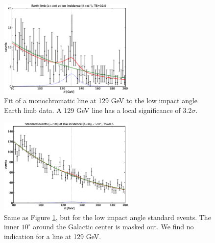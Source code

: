 \documentclass[aps,twocolumn,prd,superscriptaddress,showpacs,nofootinbib,fixfloat]{revtex4}
\begin{document}
\begin{figure}[p]
\centering
\includegraphics[width=0.6\textwidth]{plots/albedo_line_thetaCut.eps}
\caption{Fit of a monochromatic line at 129 GeV to the low impact angle Earth
  limb data. A 129 GeV line has a local significance of 3.2$\sigma$.
}
\label{fig:albedoline}
\end{figure}

\begin{figure}[p]
\centering
\includegraphics[width=0.6\textwidth]{plots/noalbedo_line_thetaCut.eps}
\caption{Same as Figure \ref{fig:albedoline}, but for the low
impact angle standard events. The inner $10^\circ$ around the Galactic center
is masked out. We find no indication for a line at 129 GeV.
}
\label{fig:noalbedoline}
\end{figure}
\end{document}
